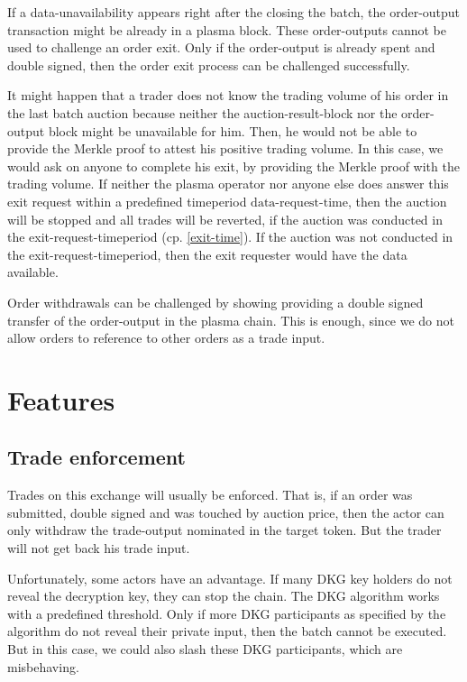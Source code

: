 \documentclass[11pt,parskip=full]{scrartcl}%
\begin{document}
If a data-unavailability appears right after the closing the batch, the order-output transaction might be already in a plasma block. 
These order-outputs cannot be used to challenge an order exit. 
Only if the order-output is already spent and double signed, then the order exit process can be challenged successfully. 

It might happen that a trader does not know the trading volume of his order in the last batch auction because neither the auction-result-block nor the order-output block might be unavailable for him. 
Then, he would not be able to provide the Merkle proof to attest his positive trading volume. 
In this case, we would ask on anyone to complete his exit, by providing the Merkle proof with the trading volume. 
If neither the plasma operator nor anyone else does answer this exit request within a predefined timeperiod $\text{data-request-time}$, then the auction will be stopped and all trades will be reverted, if the auction was conducted in the exit-request-timeperiod (cp. \ref{exit-time}). If the auction was not conducted in the exit-request-timeperiod, then the exit requester would have the data available.

Order withdrawals can be challenged by showing providing a double signed transfer of the order-output in the plasma chain. This is enough, since we do not allow orders to reference to other orders as a trade input.

\newpage

\section{Features}

\subsection{Trade enforcement}
Trades on this exchange will usually be enforced. 
That is, if an order was submitted, double signed and was touched by auction price, then the actor can only withdraw the trade-output nominated in the target token. 
But the trader will not get back his trade input. 

Unfortunately, some actors have an advantage.
If many DKG key holders do not reveal the decryption key, they can stop the chain. 
The DKG algorithm works with a predefined threshold. 
Only if more DKG participants as specified by the algorithm do not reveal their private input, then the batch cannot be executed. 
But in this case, we could also slash these DKG participants, which are misbehaving. 
\end{document}
